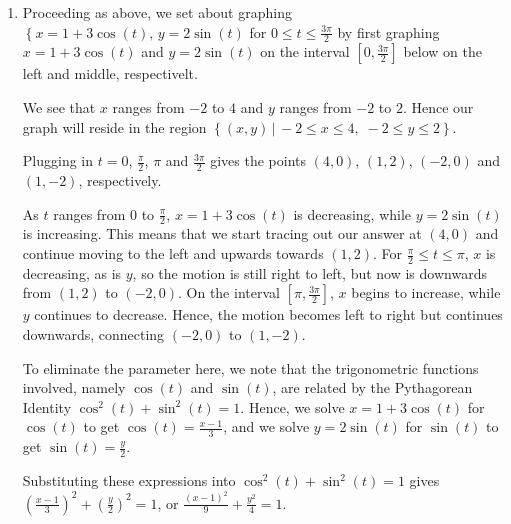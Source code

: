 \documentclass{ximera}
\begin{document}
\begin{example}
\begin{explanation}
\begin{enumerate}
  
 
 We see that the parametrization given above traces out the portion of $y = \frac{1}{x}$ for $0< x \leq 1$ \textit{twice} as $t$ runs through the interval $(0,\pi)$ as indicated above on the right.



\item  Proceeding as above, we set about graphing $\left\{  x = 1 + 3\cos(t), \,  y =2\sin(t) \right.$ for $0 \leq t \leq \frac{3\pi}{2}$ by first graphing $x = 1 + 3\cos(t)$ and $y = 2\sin(t)$ on the interval $\left[0, \frac{3\pi}{2}\right]$ below on the left and middle, respectivelt.

 

 We see that $x$ ranges from $-2$ to $4$ and $y$ ranges from $-2$ to $2$.  Hence our graph will reside in the region $\left\{ (x,y) \, | \, -2 \leq x \leq 4, \;  -2 \leq y \leq 2 \right\}$.
 
  
 
  Plugging in $t = 0$, $\frac{\pi}{2}$, $\pi$ and $\frac{3\pi}{2}$ gives the points $(4,0)$, $(1,2)$, $(-2,0)$ and $(1,-2)$, respectively.  
  
   
  
  As $t$ ranges from $0$ to $\frac{\pi}{2}$, $x = 1 + 3\cos(t)$ is decreasing, while $y = 2\sin(t)$ is increasing.  This means that we start tracing out our answer at $(4,0)$ and continue moving to the left and upwards towards $(1,2)$.    For $\frac{\pi}{2} \leq t \leq \pi$, $x$ is decreasing, as is $y$, so the motion is still right to left, but now is downwards from $(1,2)$ to $(-2,0)$.   On the interval $\left[\pi, \frac{3\pi}{2}\right]$, $x$ begins to increase, while $y$ continues to decrease.  Hence, the motion becomes left to right but continues downwards, connecting $(-2,0)$ to $(1,-2)$. 
  
   
  
 To eliminate the parameter here, we note that the trigonometric functions involved, namely $\cos(t)$ and $\sin(t)$, are related by the Pythagorean Identity $\cos^{2}(t) + \sin^{2}(t) = 1$. Hence, we solve $x = 1+3\cos(t)$ for $\cos(t)$ to get $\cos(t) = \frac{x-1}{3}$, and we solve $y = 2\sin(t)$ for $\sin(t)$ to get $\sin(t) = \frac{y}{2}$. 
 
  
 
  Substituting these expressions into $\cos^{2}(t) + \sin^{2}(t) = 1$ gives $\left(\frac{x-1}{3}\right)^2 + \left(\frac{y}{2}\right)^2 = 1$, or $\frac{(x-1)^2}{9} + \frac{y^2}{4} = 1$. 
  
   
  

\end{enumerate}
\end{explanation}
\end{example}
\end{document}
